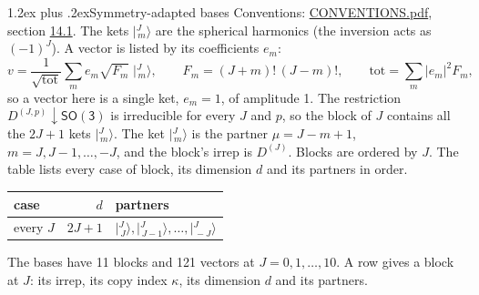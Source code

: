 \documentclass[10pt,a4paper]{article}
\makeatletter
\renewcommand\section{\@startsection{section}{1}{\z@}{-3ex plus -1ex minus -.2ex}%
  {1.2ex plus .2ex}{\normalfont\large\sffamily\bfseries\color{parttitle}}}
\numberwithin{equation}{section}
\newcommand{\grp}[1]{\mathsf{#1}}
\newcommand{\restr}[2]{#1\!\downarrow#2}
\newcommand{\irrJ}[1]{D^{(#1)}}
\newcommand{\irrJp}[2]{D^{(#1,#2)}}
\newcommand{\mult}{\kappa}
\newcommand{\intx}{\mu}
\newcommand{\jm}[2]{\bigl\lvert{}^{#1}_{\,#2}\bigr\rangle}
\makeatother
\begin{document}
\section{Symmetry-adapted bases}\label{s:bases}
Conventions: \href{../../CONVENTIONS.pdf}{CONVENTIONS.pdf}, section \href{../../CONVENTIONS.pdf\#conv.14.1}{14.1}.
\leavevmode\label{n:index.m}\label{n:vector.ket}The kets $\jm{J}{m}$ are the spherical harmonics (the inversion acts as $(-1)^J$). \label{n:index.ketcoefficient}\label{n:vector.basis.symmetry}\label{n:index.ketweight}\label{n:index.total}A vector is listed by its coefficients $e_m$:
\begin{equation}\label{e:ket}v = \frac{1}{\sqrt{\mathrm{tot}}}\sum_m e_m\sqrt{F_m}\;\jm{J}{m},\qquad F_m = (J+m)!\,(J-m)!,\qquad \mathrm{tot} = \sum_m |e_m|^2F_m,\end{equation}
so a vector here is a single ket, $e_m = 1$, of amplitude 1.
The restriction $\restr{\irrJp{J}{p}}{\grp{SO(3)}}$ is irreducible for every $J$ and $p$, so the block of $J$ contains all the $2J+1$ kets $\jm{J}{m}$. The ket $\jm{J}{m}$ is the partner $\intx = J - m + 1$, $m = J, J-1, \dots, -J$, and the block's irrep is $\irrJ{J}$. Blocks are ordered by $J$. \label{n:head.case}\label{n:head.partners}The table lists every case of block, its dimension $d$ and its partners in order.
\begin{center}\begin{tabular}{@{}lrl@{}}\toprule
case & $d$ & partners\\\midrule
every $J$ & $2J+1$ & $\jm{J}{J}, \jm{J}{J-1}, \dots, \jm{J}{-J}$\\
\bottomrule\end{tabular}\end{center}
The bases have 11 blocks and 121 vectors at $J = 0, 1, \dots, 10$. \label{n:index.copy}\label{n:head.irrep}A row gives a block at $J$: its irrep, its copy index $\mult$, its dimension $d$ and its partners.
\end{document}
